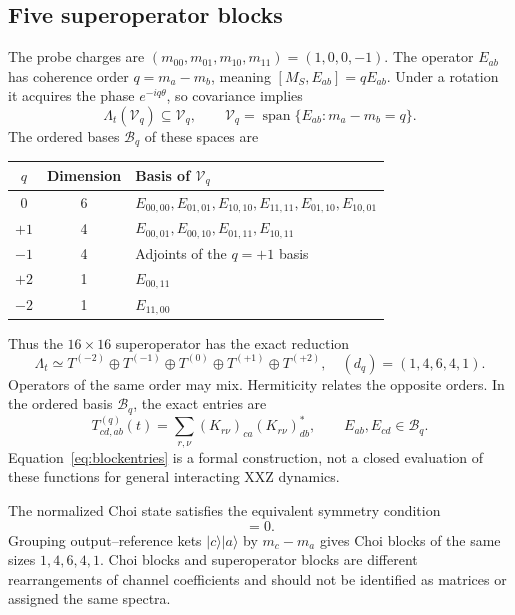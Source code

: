 \documentclass[11pt,a4paper]{article}
\newcommand{\ket}[1]{\lvert #1\rangle}
\begin{document}
\subsection{Five superoperator blocks}

The probe charges are $(m_{00},m_{01},m_{10},m_{11})=(1,0,0,-1)$.
The operator $E_{ab}$ has coherence order $q=m_a-m_b$, meaning
$[M_S,E_{ab}]=qE_{ab}$. Under a rotation it acquires the phase
$e^{-iq\theta}$, so covariance implies
\begin{equation}
 \Lambda_t(\mathcal V_q)\subseteq\mathcal V_q,\qquad
 \mathcal V_q=\operatorname{span}\{E_{ab}:m_a-m_b=q\}.
\end{equation}
The ordered bases $\mathcal B_q$ of these spaces are
\begin{center}
\begin{tabular}{@{}ccl@{}}
\toprule
$q$&Dimension&Basis of $\mathcal V_q$\\\midrule
$0$&6&$E_{00,00},E_{01,01},E_{10,10},E_{11,11},E_{01,10},E_{10,01}$\\
$+1$&4&$E_{00,01},E_{00,10},E_{01,11},E_{10,11}$\\
$-1$&4&Adjoints of the $q=+1$ basis\\
$+2$&1&$E_{00,11}$\\
$-2$&1&$E_{11,00}$\\\bottomrule
\end{tabular}
\end{center}
Thus the $16\times16$ superoperator has the exact reduction
\begin{equation}
 \boxed{\Lambda_t\simeq T^{(-2)}\oplus T^{(-1)}\oplus T^{(0)}
               \oplus T^{(+1)}\oplus T^{(+2)},\quad
               (d_q)=(1,4,6,4,1).}
 \label{eq:blocks}
\end{equation}
Operators of the same order may mix. Hermiticity relates the opposite
orders. In the ordered basis $\mathcal B_q$, the exact entries are
\begin{equation}
 T^{(q)}_{cd,ab}(t)
 =\sum_{r,\nu}(K_{r\nu})_{ca}(K_{r\nu})_{db}^*,
 \qquad E_{ab},E_{cd}\in\mathcal B_q.
 \label{eq:blockentries}
\end{equation}
Equation~\eqref{eq:blockentries} is a formal construction, not a closed
evaluation of these functions for general interacting XXZ dynamics.

The normalized Choi state satisfies the equivalent symmetry condition
\begin{equation}
 [J_t,M_S\otimes I_R-I_{AB}\otimes M_S^{\mathsf T}]=0.
\end{equation}
Grouping output--reference kets $\ket c\ket a$ by $m_c-m_a$ gives Choi
blocks of the same sizes $1,4,6,4,1$. Choi blocks and superoperator
blocks are different rearrangements of channel coefficients and should
not be identified as matrices or assigned the same spectra.
\end{document}
